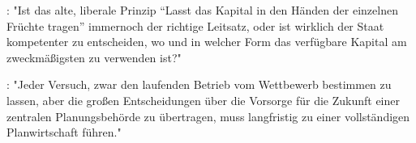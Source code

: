 \documentclass[
    onecolumn,
    a4paper,
    abstracton,
    parskip=half
    ,final
    ]{scrartcl}
\begin{document}
\citep[vgl.][S.23f]{Hayek1969}: "Ist das alte, liberale Prinzip “Lasst das Kapital in den Händen der einzelnen Früchte tragen” immernoch der richtige Leitsatz,
 oder ist wirklich der Staat kompetenter zu entscheiden, wo und in welcher Form das verfügbare Kapital am zweckmäßigsten zu verwenden ist?"


 \citep[vgl.][S.23f]{Hayek1969}: "Jeder Versuch, zwar den laufenden Betrieb vom Wettbewerb bestimmen zu lassen,
 aber die großen Entscheidungen über die Vorsorge für die Zukunft einer zentralen Planungsbehörde zu übertragen,
muss langfristig zu einer vollständigen Planwirtschaft führen."
\end{document}
